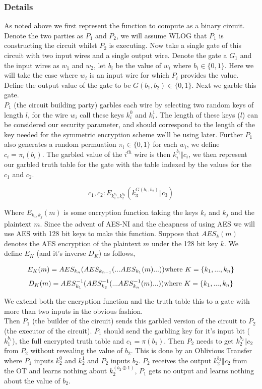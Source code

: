 \documentclass[a4paper,10pt]{article}
\begin{document}
	\subsubsection{Details} \label{Yao_Details}
		As noted above we first represent the function to compute as a binary circuit. Denote the two parties as $P_1$ and $P_2$, we will assume WLOG that $P_1$ is constructing the circuit whilst $P_2$ is executing. Now take a single gate of this circuit with two input wires and a single output wire. Denote the gate a $G_1$ and the input wires as $w_1$ and $w_2$, let $b_i$ be the value of $w_i$ where $b_i \in \{0, 1\}$. Here we will take the case where $w_i$ is an input wire for which $P_i$ provides the value. Define the output value of the gate to be $G(b_1, b_2) \in \{0, 1\}$. Next we garble this gate.\\

		$P_1$ (the circuit building party) garbles each wire by selecting two random keys of length $l$, for the wire $w_i$ call these keys $k_i^0$ and $k_i^1$. The length of these keys ($l$) can be considered our security parameter, and should correspond to the length of the key needed for the symmetric encryption scheme we'll be using later. Further $P_1$ also generates a random permuation $\pi_i \in \{0, 1\}$ for each $w_i$, we define $c_i = \pi_i(b_i)$. The garbled value of the $i^{th}$ wire is then $k_i^{b_i} \Vert c_i$, we then represent our garbled truth table for the gate with the table indexed by the values for the $c_1$ and $c_2$.

		$$ c_1, c_2 : E_{k_1^{b_1}, k_2^{b_2}} (k_3^{ G(b_1, b_2) } \Vert c_3) $$

		Where $E_{k_i, k_j}(m)$ is some encryption function taking the keys $k_i$ and $k_j$ and the plaintext $m$. Since the advent of AES-NI and the cheapness of using AES we will use AES with 128 bit keys to make this function. Suppose that $AES_k(m)$ denotes the AES encryption of the plaintext $m$ under the 128 bit key $k$. We define $E_K$ (and it's inverse $D_K$)  as follows,

		$$ E_K(m) = AES_{k_n}( AES_{k_{n-1}}( ...AES_{k_1}(m) ...) ) \textnormal{where } K = \{k_1, ..., k_n\}$$ 
		$$ D_K(m) = AES^{-1}_{k_1}( AES^{-1}_{k_{2}}( ...AES^{-1}_{k_n}(m) ...) ) \textnormal{where } K = \{k_1, ..., k_n\}$$ 

		We extend both the encryption function and the truth table this to a gate with more than two inputs in the obvious fashion.\\

		Then $P_1$ (the builder of the circuit) sends this garbled version of the circuit to $P_2$ (the executor of the circuit). $P_1$ should send the garbling key for it's input bit ($k_1^{b_1}$), the full encrypted truth table and $c_1 = \pi(b_1)$. Then $P_2$ needs to get $k_2^{b_2} \Vert c_2$ from $P_2$ without revealing the value of $b_2$. This is done by an Oblivious Transfer where $P_1$ inputs $k_2^0$ and $k_2^1$ and $P_2$ inputs $b_2$. $P_2$ receives the output $k_2^{b_2} \Vert c_2$ from the OT and learns nothing about $k_2^{(b_2 \oplus 1)} $, $P_1$ gets no output and learns nothing about the value of $b_2$.\\
\end{document}
